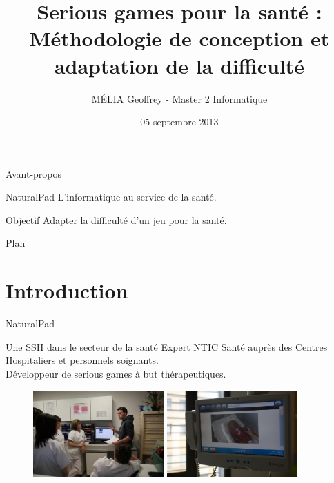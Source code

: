 \documentclass{beamer}
\title[Conception et adaptation de Serious Games]{Serious games pour la santé :\\ Méthodologie de conception et adaptation de la difficulté}
\author{MÉLIA Geoffrey - Master 2 Informatique}
\institute{Université Montpellier II - NaturalPad}
\date{05 septembre 2013}
\begin{document}
		
	\begin{frame}
		\titlepage
	\end{frame}
	
	\begin{frame}{Avant-propos}
		\begin{block}{NaturalPad}
			L'informatique au service de la santé.
		\end{block}		
		\begin{block}{Objectif}
			Adapter la difficulté d'un jeu pour la santé.
		\end{block}		
	\end{frame}
	
	\begin{frame}{Plan}
		\tableofcontents
	\end{frame}
	
	\section{Introduction}
		
		\begin{frame}{NaturalPad}
			\begin{block}{Une SSII dans le secteur de la santé}
				Expert NTIC Santé auprès des Centres Hospitaliers et personnels soignants.\\
				Développeur de serious games à but thérapeutiques.
			\end{block}
			
			\begin{figure}
				\includegraphics[width=5cm]{../images/formation.jpg}
				\includegraphics[width=5cm]{../images/bebeonline.jpg}		
			\end{figure}
		\end{frame}	
	
\end{document}
